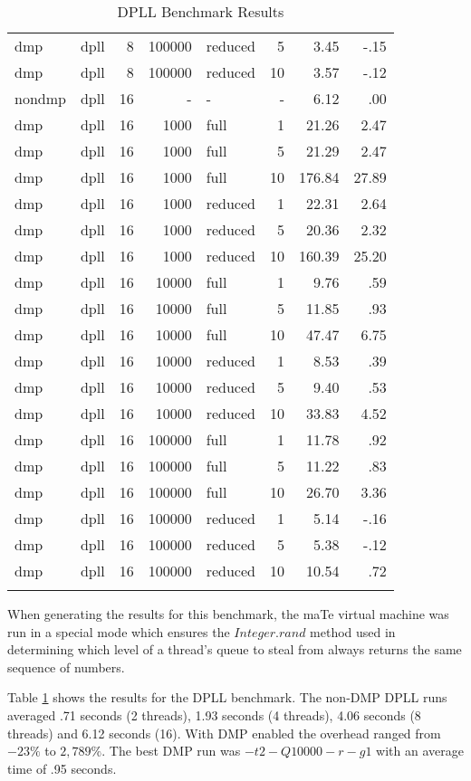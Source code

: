 \begin{center}
\begin{small}
\begin{longtable}{llrrlrrr}
dmp & dpll & 8 & 100000 & reduced & 5 & 3.45 & -.15\\
dmp & dpll & 8 & 100000 & reduced & 10 & 3.57 & -.12\\
\hline
nondmp & dpll & 16 & - & - & - & 6.12 & .00\\
dmp & dpll & 16 & 1000 & full & 1 & 21.26 & 2.47\\
dmp & dpll & 16 & 1000 & full & 5 & 21.29 & 2.47\\
dmp & dpll & 16 & 1000 & full & 10 & 176.84 & 27.89\\
dmp & dpll & 16 & 1000 & reduced & 1 & 22.31 & 2.64\\
dmp & dpll & 16 & 1000 & reduced & 5 & 20.36 & 2.32\\
dmp & dpll & 16 & 1000 & reduced & 10 & 160.39 & 25.20\\
dmp & dpll & 16 & 10000 & full & 1 & 9.76 & .59\\
dmp & dpll & 16 & 10000 & full & 5 & 11.85 & .93\\
dmp & dpll & 16 & 10000 & full & 10 & 47.47 & 6.75\\
dmp & dpll & 16 & 10000 & reduced & 1 & 8.53 & .39\\
dmp & dpll & 16 & 10000 & reduced & 5 & 9.40 & .53\\
dmp & dpll & 16 & 10000 & reduced & 10 & 33.83 & 4.52\\
dmp & dpll & 16 & 100000 & full & 1 & 11.78 & .92\\
dmp & dpll & 16 & 100000 & full & 5 & 11.22 & .83\\
dmp & dpll & 16 & 100000 & full & 10 & 26.70 & 3.36\\
dmp & dpll & 16 & 100000 & reduced & 1 & 5.14 & -.16\\
dmp & dpll & 16 & 100000 & reduced & 5 & 5.38 & -.12\\
dmp & dpll & 16 & 100000 & reduced & 10 & 10.54 & .72\\
\hline
\caption{DPLL Benchmark Results}
\label{tab:dpll_results}
\end{longtable}
\end{small}
\end{center}

When generating the results for this benchmark, the maTe virtual
machine was run in a special mode which ensures the $Integer.rand$
method used in determining which level of a thread's queue to steal
from always returns the same sequence of numbers.

Table \ref{tab:dpll_results} shows the results for the DPLL benchmark.
The non-DMP DPLL runs averaged .71 seconds (2 threads), 1.93 seconds
(4 threads), 4.06 seconds (8 threads) and 6.12 seconds (16).  With DMP
enabled the overhead ranged from $-23\%$ to $2,789\%$.  The best DMP
run was $-t2 -Q10000 -r -g1$ with an average time of .95 seconds.

